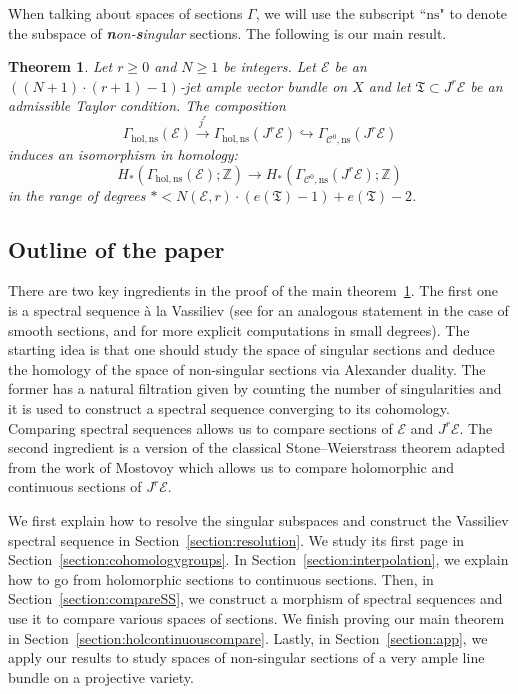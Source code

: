 \documentclass[a4paper]{amsart}
\newcommand{\bZ}{\mathbb Z}
\newcommand{\cE}{\mathcal E}
\newcommand{\cC}{\mathcal C}
\newcommand{\fT}{\mathfrak T}
\newcommand{\lra}{\longrightarrow}
\theoremstyle{plain}
\newtheorem{theorem}{Theorem}[section]
\theoremstyle{definition}
\begin{document}
When talking about spaces of sections $\Gamma$, we will use the subscript ``$\mathrm{ns}$" to denote the subspace of \emph{\textbf{n}on-\textbf{s}ingular} sections. The following is our main result.
\begin{theorem}\label{thm:mainthm}
Let $r \geq 0$ and $N \geq 1$ be integers. Let $\cE$ be an $\left( (N+1) \cdot (r+1) - 1\right)$-jet ample vector bundle on $X$ and let $\fT \subset J^r\cE$ be an admissible Taylor condition. The composition
\[
    \Gamma_{\mathrm{hol,ns}}\left( \cE \right) \overset{j^r}{\lra} \Gamma_{\mathrm{hol,ns}}\left( J^r\cE \right) \hookrightarrow \Gamma_{\cC^0, \mathrm{ns}}\left( J^r\cE \right)
\]
induces an isomorphism in homology:
\[
    H_*\left(\Gamma_{\mathrm{hol, ns}}(\cE); \bZ\right) \lra H_*\left(\Gamma_{\cC^0, \mathrm{ns}}(J^r\cE); \bZ\right)
\]
in the range of degrees $* < N(\cE,r)\cdot (e(\fT)-1) + e(\fT) - 2$.
\end{theorem}


\subsection{Outline of the paper}

There are two key ingredients in the proof of the main theorem~\ref{thm:mainthm}. The first one is a spectral sequence à la Vassiliev (see \cite[Chapter III]{vassiliev_complements_1994} for an analogous statement in the case of smooth sections, and \cite{vassiliev_how_1999} for more explicit computations in small degrees). The starting idea is that one should study the space of singular sections and deduce the homology of the space of non-singular sections via Alexander duality. The former has a natural filtration given by counting the number of singularities and it is used to construct a spectral sequence converging to its cohomology. Comparing spectral sequences allows us to compare sections of $\cE$ and $J^r\cE$. The second ingredient is a version of the classical Stone--Weierstrass theorem adapted from the work of Mostovoy \cite{mostovoy_spaces_2006} which allows us to compare holomorphic and continuous sections of $J^r\cE$.

We first explain how to resolve the singular subspaces and construct the Vassiliev spectral sequence in Section~\ref{section:resolution}. We study its first page in Section~\ref{section:cohomologygroups}. In Section~\ref{section:interpolation}, we explain how to go from holomorphic sections to continuous sections. Then, in Section~\ref{section:compareSS}, we construct a morphism of spectral sequences and use it to compare various spaces of sections. We finish proving our main theorem in Section~\ref{section:holcontinuouscompare}. Lastly, in Section~\ref{section:app}, we apply our results to study spaces of non-singular sections of a very ample line bundle on a projective variety.
\end{document}
